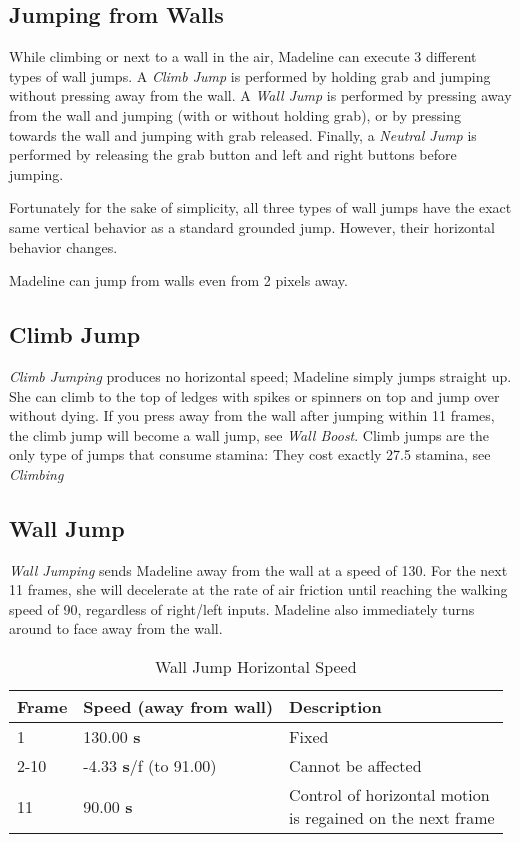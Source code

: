 \documentclass[oneside]{book}
\newcommand{\s}{\textbf{s}}
\begin{document}
\subsection{Jumping from Walls}

While climbing or next to a wall in the air, Madeline can execute 3 different types of wall jumps. A \textit{Climb Jump} is performed by holding grab and jumping without pressing away from the wall. A \textit{Wall Jump} is performed by pressing away from the wall and jumping (with or without holding grab), or by pressing towards the wall and jumping with grab released. Finally, a \textit{Neutral Jump} is performed by releasing the grab button and left and right buttons before jumping.

Fortunately for the sake of simplicity, all three types of wall jumps have the exact same vertical behavior as a standard grounded jump. However, their horizontal behavior changes.

Madeline can jump from walls even from 2 pixels away.

\subsection{Climb Jump}

\textit{Climb Jumping} produces no horizontal speed; Madeline simply jumps straight up. She can climb to the top of ledges with spikes or spinners on top and jump over without dying. If you press away from the wall after jumping within 11 frames, the climb jump will become a wall jump, see \textit{Wall Boost}. Climb jumps are the only type of jumps that consume stamina: They cost exactly 27.5 stamina, see \textit{Climbing}

\subsection{Wall Jump}

\textit{Wall Jumping} sends Madeline away from the wall at a speed of 130. For the next 11 frames, she will decelerate at the rate of air friction until reaching the walking speed of 90, regardless of right/left inputs. Madeline also immediately turns around to face away from the wall.

\begin{table}[h]
\begin{tabular}{|l|l|l|}
\hline
Frame&Speed (away from wall)&Description\\
\hline
1&130.00 \s &Fixed\\
\hline
2-10&-4.33 \s/f (to 91.00)&Cannot be affected\\
\hline
11&90.00 \s &\makecell[l]{Control of horizontal motion\\ is regained on the next frame}\\
\hline
\end{tabular}
\caption{Wall Jump Horizontal Speed}
\end{table}
\end{document}
